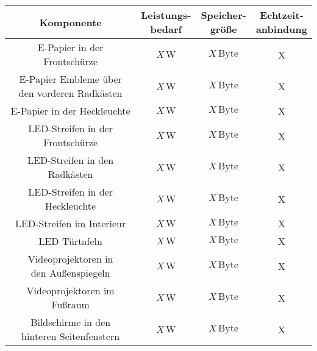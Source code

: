 \begin{table}[hbt]	
	\centering
	\renewcommand{\arraystretch}{1.5}	%
	\label{tab:Werte}
	\begin{tabular}{c|ccc}
		\textbf{Komponente} & \parbox[t]{0.16\linewidth}{\centering Leistungs-\\bedarf} & \parbox[t]{0.16\linewidth}{\centering Speicher-\\größe} & \parbox[t]{0.16\linewidth}{\centering Echtzeit-\\anbindung} \\ 
		\hline 
		\hline 
		\parbox[t]{0.4\linewidth}{\centering E-Papier in der Frontschürze} & $ X\,\mathrm{W} $ & $ X\,\mathrm{Byte} $ & X \\ \parbox[t]{0.4\linewidth}{\centering E-Papier Embleme über\\den vorderen Radkästen} & $ X\,\mathrm{W} $ & $ X\,\mathrm{Byte} $ & X \\\parbox[t]{0.4\linewidth}{\centering E-Papier in der Heckleuchte} & $ X\,\mathrm{W} $ & $ X\,\mathrm{Byte} $ & X \\
		\parbox[t]{0.4\linewidth}{\centering LED-Streifen in der Frontschürze} & $ X\,\mathrm{W} $ & $ X\,\mathrm{Byte} $ & X \\
		\parbox[t]{0.4\linewidth}{\centering LED-Streifen in den Radkästen} & $ X\,\mathrm{W} $ & $ X\,\mathrm{Byte} $ & X \\ \parbox[t]{0.4\linewidth}{\centering LED-Streifen in der Heckleuchte} & $ X\,\mathrm{W} $ & $ X\,\mathrm{Byte} $ & X \\ \parbox[t]{0.4\linewidth}{\centering LED-Streifen im Interieur} & $ X\,\mathrm{W} $ & $ X\,\mathrm{Byte} $ & X \\
		\parbox[t]{0.4\linewidth}{\centering LED Türtafeln} & $ X\,\mathrm{W} $ & $ X\,\mathrm{Byte} $ & X \\
		\parbox[t]{0.4\linewidth}{\centering Videoprojektoren in\\den Außenspiegeln} & $ X\,\mathrm{W} $ & $ X\,\mathrm{Byte} $ & X \\ \parbox[t]{0.4\linewidth}{\centering Videoprojektoren im Fußraum} & $ X\,\mathrm{W} $ & $ X\,\mathrm{Byte} $ & X \\
		\parbox[t]{0.4\linewidth}{\centering Bildschirme in den\\hinteren Seitenfenstern} &$ X\,\mathrm{W} $ & $ X\,\mathrm{Byte} $ & X \\

\end{tabular}
\end{table}
